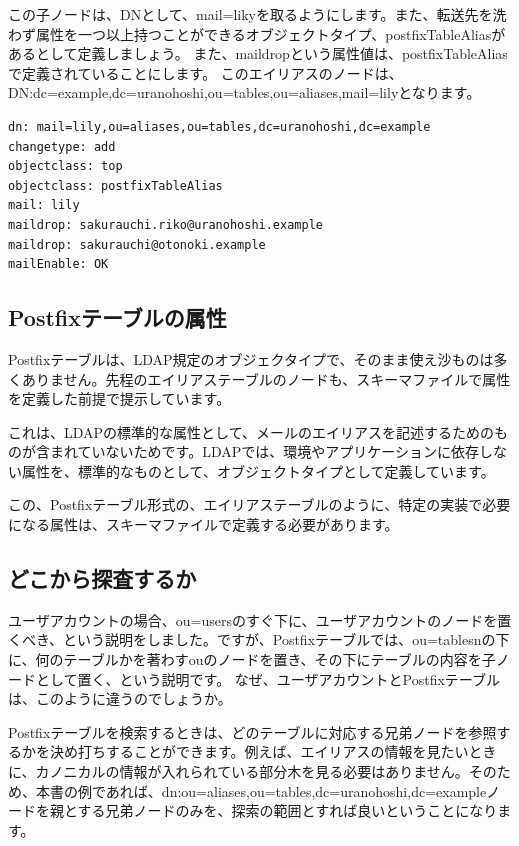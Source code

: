 この子ノードは、DNとして、mail=likyを取るようにします。また、転送先を洗わず属性を一つ以上持つことができるオブジェクトタイプ、postfixTableAliasがあるとして定義しましょう。
また、maildropという属性値は、postfixTableAliasで定義されていることにします。
このエイリアスのノードは、DN:dc=example,dc=uranohoshi,ou=tables,ou=aliases,mail=lilyとなります。

\begin{verbatim}
dn: mail=lily,ou=aliases,ou=tables,dc=uranohoshi,dc=example
changetype: add
objectclass: top
objectclass: postfixTableAlias
mail: lily
maildrop: sakurauchi.riko@uranohoshi.example
maildrop: sakurauchi@otonoki.example
mailEnable: OK
\end{verbatim}

\subsection{Postfixテーブルの属性}

Postfixテーブルは、LDAP規定のオブジェクタイプで、そのまま使え沙ものは多くありません。先程のエイリアステーブルのノードも、スキーマファイルで属性を定義した前提で提示しています。

これは、LDAPの標準的な属性として、メールのエイリアスを記述するためのものが含まれていないためです。LDAPでは、環境やアプリケーションに依存しない属性を、標準的なものとして、オブジェクトタイプとして定義しています。

この、Postfixテーブル形式の、エイリアステーブルのように、特定の実装で必要になる属性は、スキーマファイルで定義する必要があります。

\subsection{どこから探査するか}

ユーザアカウントの場合、ou=usersのすぐ下に、ユーザアカウントのノードを置くべき、という説明をしました。ですが、Postfixテーブルでは、ou=tablesnの下に、何のテーブルかを著わすouのノードを置き、その下にテーブルの内容を子ノードとして置く、という説明です。
なぜ、ユーザアカウントとPostfixテーブルは、このように違うのでしょうか。

Postfixテーブルを検索するときは、どのテーブルに対応する兄弟ノードを参照するかを決め打ちすることができます。例えば、エイリアスの情報を見たいときに、カノニカルの情報が入れられている部分木を見る必要はありません。そのため、本書の例であれば、dn:ou=aliases,ou=tables,dc=uranohoshi,dc=exampleノードを親とする兄弟ノードのみを、探索の範囲とすれば良いということになります。

